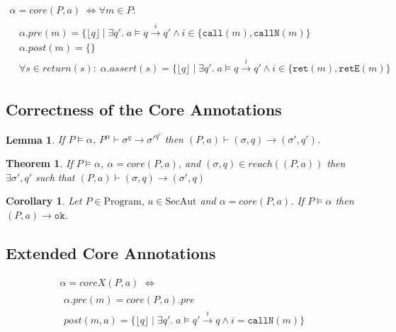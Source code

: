 \documentclass[10pt,notitlepage,twoside]{article}
\newcommand{\aut}{a}
\newcommand{\floor}[1]{\lfloor #1 \rfloor}
\newcommand{\emdef}[2]{(#1,#2)}
\newcommand{\pre}{\mathit{pre}}
\newcommand{\post}{\mathit{post}}
\newtheorem{theorem}{Theorem}
\newtheorem{lemma}{Lemma}
\newtheorem{corollary}{Corollary}
\begin{document}
\begin{displaymath}
\begin{array}{l}
\alpha = \mathit{core}(P,a) \;\Leftrightarrow \forall m \in P: \\
\;\; \begin{array}{ll}
\alpha.\pre(m) = \{ \floor{q} \mid \exists q'.\; a \models q \stackrel{i}{\rightarrow} q' \wedge i \in \{ \texttt{call}(m), \texttt{callN}(m) \} \\
\alpha.\post(m) = \{  \}  \\
\forall s \in \mathit{return}(s):\; \alpha.\mathit{assert}(s) = \{ \floor{q} \mid \exists q'.\; a \models q \stackrel{i}{\rightarrow} q' \wedge i \in \{ \texttt{ret}(m), \texttt{retE}(m) \}
\end{array}
\end{array}
\end{displaymath}

\subsection{Correctness of the Core Annotations}

\begin{lemma}
If $P \models \alpha$, $P^\alpha \vdash \sigma^q \rightarrow \sigma'^{q'}$ then $(P,\aut) \vdash (\sigma,q) \rightarrow (\sigma',q')$.
\end{lemma}

\begin{theorem}
If $P \models \alpha$, $\alpha = \mathit{core}(P,\aut)$, and $(\sigma,q) \in \mathit{reach}(\emdef{P}{\aut})$ then $\exists \sigma',q'$ such that $\emdef{P}{\aut} \vdash (\sigma,q) \rightarrow (\sigma',q)$ 
\end{theorem}

\begin{corollary}
Let $P \in \textrm{Program}$, $a \in \textrm{SecAut}$ and $\alpha = \mathit{core}(P,a)$. If $P \models \alpha$ then $\emdef{P}{\aut} \rightarrow \texttt{ok}$.
\end{corollary}


\subsection{Extended Core Annotations}



\begin{displaymath}
\begin{array}{l}
\alpha = \mathit{coreX}(P,a) \;\Leftrightarrow \\
\begin{array}{ll}
\alpha.\pre(m) = \mathit{core}(P,a).\pre \\ 
\post(m,a) = \{ \floor{q} \mid \exists q'.\; a \models q' \stackrel{i}{\rightarrow} q \wedge i = \texttt{callN}(m)  \}  \\
\end{array}
\end{array}
\end{displaymath}
\end{document}

